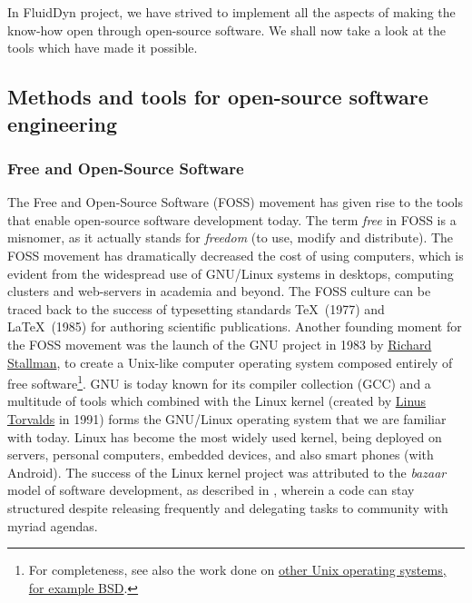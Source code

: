 In FluidDyn project, we have strived to implement all the aspects of making the
know-how open through open-source software. We shall now take a look at the
tools which have made it possible.

\subsection{Methods and tools for open-source software engineering}

\subsubsection{Free and Open-Source Software}

The Free and Open-Source Software (FOSS) movement has given rise to the tools
that enable open-source software development today.
%
The term \emph{free} in FOSS is a misnomer, as it actually stands for
\emph{freedom} (to use, modify and distribute). The FOSS movement has
dramatically decreased the cost of using computers, which is evident from the
widespread use of GNU/Linux systems in desktops, computing clusters and
web-servers in academia and beyond.
%
The FOSS culture can be traced back to the success of typesetting
standards \TeX\ (1977) and \LaTeX\ (1985) for authoring scientific publications.
%
Another founding moment for the FOSS movement was the launch of the GNU project
in 1983 by \href{https://en.wikipedia.org/wiki/Richard_Stallman}{Richard
  Stallman}, to create a Unix-like computer operating system composed entirely
  of free software\footnote{For completeness, see also the work done on
  \href{https://www.levenez.com/unix/}{other Unix operating systems, for
example BSD}.}.
%
GNU is today known for its compiler collection (GCC) and a multitude of tools
which combined with the Linux kernel (created by
\href{https://en.wikipedia.org/wiki/Linus_Torvalds}{Linus Torvalds} in 1991)
forms the GNU/Linux operating system
that we are familiar with today.
%
%
Linux has become the most widely used kernel, being deployed on servers,
personal computers, embedded devices, and also smart phones (with Android). The
success of the Linux kernel project was attributed to the \emph{bazaar} model of
software development, as described in \citet{raymond_cathedral_1999}, wherein a
code can stay structured despite releasing frequently and delegating tasks to
community with myriad agendas.

